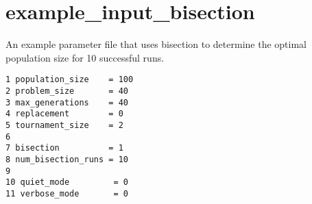 \hypertarget{example__input__bisection-example}{
\section{example\_\-input\_\-bisection}
}
An example parameter file that uses bisection to determine the optimal population size for 10 successful runs.



\begin{DocInclude}\begin{verbatim}1 population_size    = 100
2 problem_size       = 40
3 max_generations    = 40
4 replacement        = 0
5 tournament_size    = 2
6 
7 bisection          = 1
8 num_bisection_runs = 10
9 
10 quiet_mode         = 0
11 verbose_mode       = 0
\end{verbatim}
\end{DocInclude}
 